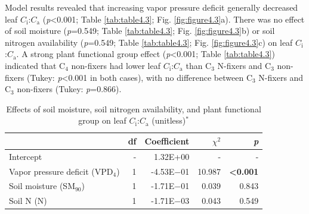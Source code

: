Model results revealed that increasing vapor pressure deficit generally decreased leaf $C_\mathrm{i}$:$C_\mathrm{a}$ (\textit{p}<0.001; Table \ref{tab:table4.3}; Fig. \ref{fig:figure4.3}a). There was no effect of soil moisture (\textit{p}=0.549; Table \ref{tab:table4.3}; Fig. \ref{fig:figure4.3}b) or soil nitrogen availability (\textit{p}=0.549; Table \ref{tab:table4.3}; Fig. \ref{fig:figure4.3}c) on leaf $C_\mathrm{i}$:$C_\mathrm{a}$. A strong plant functional group effect (\textit{p}<0.001; Table \ref{tab:table4.3}) indicated that C$_4$ non-fixers had lower leaf $C_\mathrm{i}$:$C_\mathrm{a}$ than C$_3$ N-fixers and C$_3$ non-fixers (Tukey: \textit{p}<0.001 in both cases), with no difference between C$_3$ N-fixers and C$_3$ non-fixers (Tukey: \textit{p}=0.866).

\newpage
\begin{table}
    \centering
    \caption[Effects of soil moisture, soil nitrogen availability, and plant functional group on leaf $C_\mathrm{i}$:$C_\mathrm{a}$]{Effects of soil moisture, soil nitrogen availability, and plant functional group on leaf $C_\mathrm{i}$:$C_\mathrm{a}$ (unitless)$^*$}
        \begin{tabular}{p{6cm}p{0.5cm}p{2cm}p{1.5cm}p{1.5cm}}
            \hline 
            & \multicolumn{1}{r}{df} 
            & \multicolumn{1}{r}{Coefficient} 
            & \multicolumn{1}{r}{$\chi^{2}$} 
            & \multicolumn{1}{r}{\textit{p}} 
            \\ 
            \hline
            
            Intercept
            & \multicolumn{1}{r}{-}
            & \multicolumn{1}{r}{1.32E+00}
            & \multicolumn{1}{r}{-}
            & \multicolumn{1}{r}{-}
            \\

            Vapor pressure deficit (VPD$_4$)
            & \multicolumn{1}{r}{1}
            & \multicolumn{1}{r}{-4.53E$-$01}
            & \multicolumn{1}{r}{10.987}
            & \multicolumn{1}{r}{\textbf{<0.001}}
            \\

            Soil moisture (SM$_{90}$)
            & \multicolumn{1}{r}{1}
            & \multicolumn{1}{r}{-1.71E$-$01} %
            & \multicolumn{1}{r}{0.039}
            & \multicolumn{1}{r}{0.843}
            \\

            Soil N (N)
            & \multicolumn{1}{r}{1}
            & \multicolumn{1}{r}{-1.71E$-$03}
            & \multicolumn{1}{r}{0.043}
            & \multicolumn{1}{r}{0.549}
            \\


\end{tabular}
\end{table}
